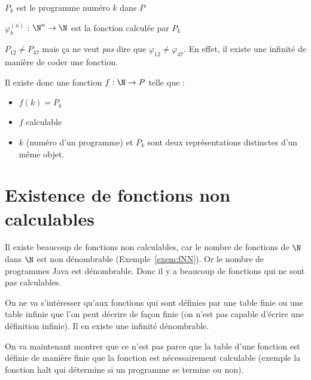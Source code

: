 \begin{mydef}[$P_k$]
	$P_k$ est le programme numéro $k$ dans $P$
\end{mydef}

\begin{mydef}[$\varphi^{(n)}_k$]
	$\varphi^{(n)}_k$ : $\N^n \rightarrow \N$ est la fonction calculée par $P_k$
\end{mydef}

\begin{myrem}
  $P_{12} \neq P_{47}$ mais ça ne veut \emph{pas} dire que $\varphi_{12} \neq \varphi_{47}$. En effet, il existe une infinité de manière de coder une fonction.
\end{myrem}

\begin{myprop}
	Il existe donc une fonction $f : \N\rightarrow P$ telle que :
	\begin{itemize}
		\item $f(k) = P_k$
		\item $f$ calculable
		\item $k$ (numéro d'un programme) et $P_k$ sont deux représentations
			distinctes d'un même objet.
	\end{itemize}
\end{myprop}


\section{Existence de fonctions non calculables}
\label{sec:existence_de_fonction_non_calculables}
Il existe beaucoup de fonctions non calculables, car le nombre de fonctions de $\N$ dans $\N$ est non dénombrable (Exemple~\ref{exem:fNN}).
Or le nombre de programmes Java est dénombrable.
Donc il y a beaucoup de fonctions qui ne sont pas calculables.

On ne va s'intéresser qu'aux fonctions qui sont définies par une table finie ou une table infinie que l'on peut décrire de façon finie (on n'est pas capable d'écrire une définition infinie). Il en existe une infinité dénombrable.

On va maintenant montrer que ce n'est pas parce que la table d'une fonction est définie de manière finie que la fonction est nécessairement calculable (exemple la fonction halt qui détermine si un programme se termine ou non).


